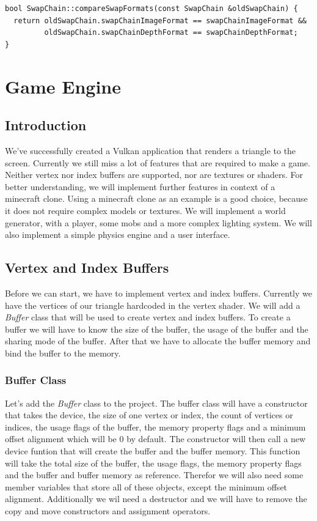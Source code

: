 \documentclass[12pt]{report} \usepackage{preamble}
\begin{document}
\begin{lstlisting}[Language=C++]
bool SwapChain::compareSwapFormats(const SwapChain &oldSwapChain) {
  return oldSwapChain.swapChainImageFormat == swapChainImageFormat && 
         oldSwapChain.swapChainDepthFormat == swapChainDepthFormat;
}
\end{lstlisting}

\chapter{Game Engine}

\section{Introduction}

We've successfully created a Vulkan application that renders a triangle to the screen. Currently we still miss a lot of features that are
required to make a game. Neither vertex nor index buffers are supported, nor are textures or shaders. For better understanding, we will implement
further features in context of a minecraft clone. Using a minecraft clone as an example is a good choice, because it does not require complex
models or textures. We will implement a world generator, with a player, some mobs and a more complex lighting system. We will also implement
a simple physics engine and a user interface.

\section{Vertex and Index Buffers}

Before we can start, we have to implement vertex and index buffers. Currently we have the vertices of our triangle hardcoded in the vertex shader.
We will add a \textit{Buffer} class that will be used to create vertex and index buffers. To create a buffer we will have to know the size of the buffer,
the usage of the buffer and the sharing mode of the buffer. After that we have to allocate the buffer memory and bind the buffer to the memory.

\subsection{Buffer Class}

Let's add the \textit{Buffer} class to the project. The buffer class will have a constructor that takes the device, the size of one vertex or index, the count of vertices or indices,
the usage flags of the buffer, the memory property flags and a minimum offset alignment which will be 0 by default. The constructor will then call a new device funtion that will create the buffer and the buffer memory.
This function will take the total size of the buffer, the usage flags, the memory property flags and the buffer and buffer memory as reference. Therefor we will also need some member variables
that store all of these objects, except the minimum offset alignment. Additionally we wil need a destructor and we will have to remove the copy and move constructors and assignment operators.
\end{document}
